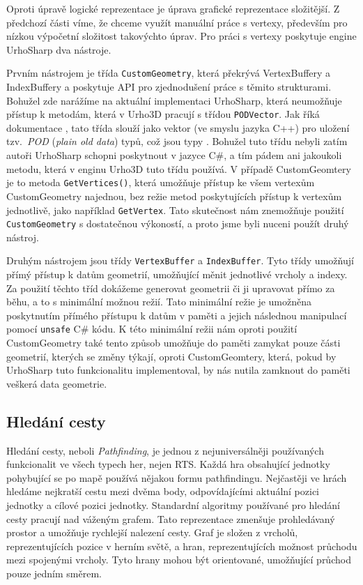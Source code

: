 Oproti úpravě logické reprezentace je úprava grafické reprezentace složitější. Z předchozí části víme, že chceme využít manuální práce s vertexy, především pro nízkou výpočetní složitost takovýchto úprav. Pro práci s vertexy poskytuje engine UrhoSharp dva nástroje. 

Prvním nástrojem je třída \texttt{CustomGeometry}, která překrývá VertexBuffery a IndexBuffery a poskytuje API pro zjednodušení práce s těmito strukturami. Bohužel zde narážíme na aktuální implementaci UrhoSharp, která neumožňuje přístup k metodám, která v Urho3D pracují s třídou \texttt{PODVector}. Jak říká dokumentace \citep{site:urho3DPOD}, tato třída slouží jako vektor (ve smyslu jazyka C++) pro uložení tzv.~\textit{POD} (\textit{plain old data}) typů, což jsou typy \textit{} . Bohužel tuto třídu nebyli zatím autoři UrhoSharp schopni poskytnout v jazyce C\#, a tím pádem ani jakoukoli metodu, která v enginu Urho3D tuto třídu používá. V případě CustomGeomtery je to metoda \texttt{GetVertices()}, která umožňuje přístup ke všem vertexům CustomGeometry najednou, bez režie metod poskytujících přístup k vertexům jednotlivě, jako například \texttt{GetVertex}. Tato skutečnost nám znemožňuje použití \texttt{CustomGeometry} s dostatečnou výkoností, a proto jsme byli nuceni použít druhý nástroj.

Druhým nástrojem jsou třídy \texttt{VertexBuffer} a \texttt{IndexBuffer}. Tyto třídy umožňují přímý přístup k datům geometrií, umožňující měnit jednotlivé vrcholy a indexy. Za použití těchto tříd dokážeme generovat geometrii či ji upravovat přímo za běhu, a to s minimální možnou režií. Tato minimální režie je umožněna poskytnutím přímého přístupu k datům v paměti a jejich následnou manipulací pomocí \texttt{unsafe} C\# kódu. K této minimální režii nám oproti použití CustomGeometry také tento způsob umožňuje do paměti zamykat pouze části geometrií, kterých se změny týkají, oproti CustomGeomtery, která, pokud by UrhoSharp tuto funkcionalitu implementoval, by nás nutila zamknout do paměti veškerá data geometrie.


\subsection{Hledání cesty}
\label{sec:pathfinding}
Hledání cesty, neboli \textit{Pathfinding}, je jednou z nejuniversálněji používaných funkcionalit ve všech typech her, nejen RTS. Každá hra obsahující jednotky pohybující se po mapě používá nějakou formu pathfindingu. Nejčastěji ve hrách hledáme nejkratší cestu mezi dvěma body, odpovídajícími aktuální pozici jednotky a cílové pozici jednotky. Standardní algoritmy používané pro hledání cesty pracují nad váženým grafem. Tato reprezentace zmenšuje prohledávaný prostor a umožňuje rychlejší nalezení cesty. Graf je složen z vrcholů, reprezentujících pozice v herním světě, a hran, reprezentujících možnost průchodu mezi spojenými vrcholy. Tyto hrany mohou být orientované, umožňující průchod pouze jedním směrem.

